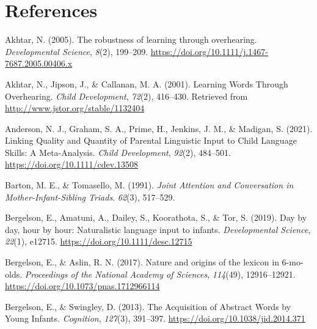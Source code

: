 \documentclass[
  man,mask,floatsintext]{apa6}
\newlength{\cslhangindent}
\newlength{\cslentryspacingunit} %
\newenvironment{CSLReferences}[2] %
 {%
  \setlength{\parindent}{0pt}
  \ifodd #1
  \let\oldpar\par
  \def\par{\hangindent=\cslhangindent\oldpar}
  \fi
  \setlength{\parskip}{#2\cslentryspacingunit}
 }%
 {}
\begin{document}
\newpage

\hypertarget{references}{%
\section{References}\label{references}}

\begingroup
\setlength{\parindent}{-0.5in}
\setlength{\leftskip}{0.5in}

\hypertarget{refs}{}
\begin{CSLReferences}{1}{0}
\leavevmode{}%
Akhtar, N. (2005). The robustness of learning through overhearing. \emph{Developmental Science}, \emph{8}(2), 199--209. \url{https://doi.org/10.1111/j.1467-7687.2005.00406.x}

\leavevmode{}%
Akhtar, N., Jipson, J., \& Callanan, M. A. (2001). Learning {Words} {Through} {Overhearing}. \emph{Child Development}, \emph{72}(2), 416--430. Retrieved from \url{http://www.jstor.org/stable/1132404}

\leavevmode{}%
Anderson, N. J., Graham, S. A., Prime, H., Jenkins, J. M., \& Madigan, S. (2021). Linking {Quality} and {Quantity} of {Parental} {Linguistic} {Input} to {Child} {Language} {Skills}: {A} {Meta}-{Analysis}. \emph{Child Development}, \emph{92}(2), 484--501. \url{https://doi.org/10.1111/cdev.13508}

\leavevmode{}%
Barton, M. E., \& Tomasello, M. (1991). \emph{Joint {Attention} and {Conversation} in {Mother}-{Infant}-{Sibling} {Triads}}. \emph{62}(3), 517--529.

\leavevmode{}%
Bergelson, E., Amatuni, A., Dailey, S., Koorathota, S., \& Tor, S. (2019). Day by day, hour by hour: {Naturalistic} language input to infants. \emph{Developmental Science}, \emph{22}(1), e12715. \url{https://doi.org/10.1111/desc.12715}

\leavevmode{}%
Bergelson, E., \& Aslin, R. N. (2017). Nature and origins of the lexicon in 6-mo-olds. \emph{Proceedings of the National Academy of Sciences}, \emph{114}(49), 12916--12921. \url{https://doi.org/10.1073/pnas.1712966114}

\leavevmode{}%
Bergelson, E., \& Swingley, D. (2013). The {Acquisition} of {Abstract} {Words} by {Young} {Infants}. \emph{Cognition}, \emph{127}(3), 391--397. \url{https://doi.org/10.1038/jid.2014.371}


\end{CSLReferences}
\end{document}
